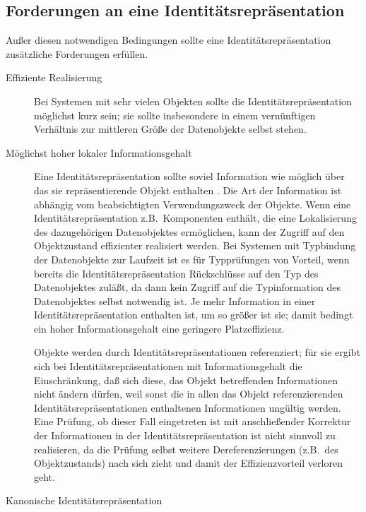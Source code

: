 \subsection{Forderungen an eine
Identit\"{a}tsrepr\"{a}sentation}
%
Au\ss{}er diesen notwendigen Bedingungen sollte eine
Identit\"{a}tsrepr\"{a}sentation zus\"{a}tzliche Forderungen erf\"{u}llen.
%
\begin{description}
%
\item[Effiziente Realisierung] Bei Systemen mit sehr vielen
Objekten sollte die Iden\-ti\-t\"{a}ts\-re\-pr\"{a}\-sen\-ta\-tion
m\"{o}glichst kurz sein; sie sollte insbesondere in einem vern\"{u}nftigen
Verh\"{a}ltnis zur mittleren Gr\"{o}\ss{}e der Datenobjekte selbst stehen.
%
\item[M\"{o}glichst hoher lokaler Informationsgehalt] Eine
Identit\"{a}tsrepr\"{a}sentation sollte soviel Information wie m\"{o}glich
\"{u}ber das sie repr\"{a}sentierende Objekt enthalten
\cite[]{bib:he89}. Die Art der Information
ist abh\"{a}ngig vom beabsichtigten Verwendungszweck der Objekte. Wenn
eine Identit\"{a}tsrepr\"{a}sentation z.B.\ Komponenten enth\"{a}lt, die eine
Lokalisierung des dazugeh\"{o}rigen Datenobjektes erm\"{o}glichen, kann der
Zugriff auf den Objektzustand effizienter realisiert werden. Bei
Systemen mit Typbindung der Datenobjekte zur Laufzeit ist es f\"{u}r
Typpr\"{u}fungen von Vorteil, wenn bereits die
Iden\-ti\-t\"{a}ts\-re\-pr\"{a}\-sen\-ta\-tion R\"{u}ck\-schl\"{u}s\-se auf den
Typ des Datenobjektes zul\"{a}\ss{}t, da dann kein Zugriff auf die
Typinformation des Datenobjektes selbst notwendig ist. Je mehr
Information in einer Iden\-ti\-t\"{a}ts\-re\-pr\"{a}\-sen\-ta\-tion
enthalten ist, um so gr\"{o}\ss{}er ist sie; damit bedingt ein hoher
Informationsgehalt eine geringere Platzeffizienz.
%
\par{}Objekte werden durch Identit\"{a}tsrepr\"{a}sentationen
referenziert; f\"{u}r sie ergibt sich bei Identit\"{a}tsrepr\"{a}sentationen
mit Informationsgehalt die Einschr\"{a}nkung, da\ss{} sich diese, das Objekt
betreffenden Informationen nicht \"{a}ndern d\"{u}rfen, weil sonst die in
allen das Objekt referenzierenden Identit\"{a}tsrepr\"{a}sentationen
enthaltenen Informationen ung\"{u}ltig werden. Eine Pr\"{u}fung, ob dieser
Fall eingetreten ist mit anschlie\ss{}ender Korrektur der Informationen
in der Identit\"{a}tsrepr\"{a}sentation ist nicht sinnvoll zu realisieren,
da die Pr\"{u}fung selbst weitere Dereferenzierungen (z.B.\ des
Objektzustands) nach sich zieht und damit der Effizienzvorteil
verloren geht.
%
\item[Kanonische Identit\"{a}tsrepr\"{a}sentation]

\end{description}
